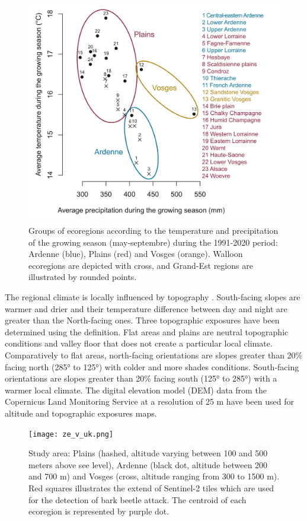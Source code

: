 \documentclass[3p,procedia]{elsarticle}
\begin{document}
\begin{figure}[htbp] 
	\centering
	\includegraphics[width=0.8\linewidth]{climat/climat_region.png}
	\caption{Groups of ecoregions according to the temperature and precipitation of the growing season (may-septembre) during the 1991-2020 period: Ardenne (blue), Plains (red) and Vosges (orange). Walloon ecoregions are depicted with cross, and Grand-Est regions are illustrated by rounded points.}
	\label{fig:clim}
\end{figure}

The regional climate is locally influenced by topography \citep{de_frenne_forest_2021}.
South-facing slopes are warmer and drier and their temperature difference between day and night are greater than the North-facing ones.
Three topographic exposures have been determined using the \cite{Delvaux_galoux} definition.
Flat areas  and plains are neutral topographic conditions and valley floor that does not create a particular local climate.
Comparatively to flat areas, north-facing orientations are slopes greater than  20\% facing north (285° to 125°) with colder and more shades conditions.
South-facing orientations are slopes greater than  20\% facing south (125° to 285°) with a warmer local climate.
The digital elevation model (DEM) data from the Copernicus Land Monitoring Service \citep{DEM_copernicus} at a resolution of 25 m have been used for altitude and topographic exposures maps.

\begin{figure} [htbp] 
	\centering
	\texttt{[image: ze\_v\_uk.png]}
	\caption{Study area: Plains (hashed, altitude varying between 100 and 500 meters above see level), Ardenne (black dot, altitude between 200 and 700 m) and Vosges (cross, altitude ranging from 300 to 1500 m). Red squares illustrates the extend of Sentinel-2 tiles which are used for the detection of bark beetle attack. The centroid of each ecoregion is represented by purple dot.}
	\label{fig:situ}
\end{figure}
\end{document}
